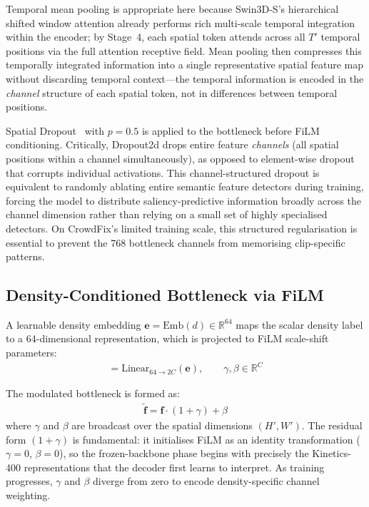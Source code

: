 \documentclass[twocolumn]{article}
\begin{document}
Temporal mean pooling is appropriate here because Swin3D-S's hierarchical
shifted window attention already performs rich multi-scale temporal
integration within the encoder; by Stage~4, each spatial token attends
across all $T'$ temporal positions via the full attention receptive field.
Mean pooling then compresses this temporally integrated information into
a single representative spatial feature map without discarding temporal
context---the temporal information is encoded in the \emph{channel} structure
of each spatial token, not in differences between temporal positions.

Spatial Dropout~\citep{pytorch} with $p\!=\!0.5$ is applied to the bottleneck
before FiLM conditioning.  Critically, Dropout2d drops entire feature
\emph{channels} (all spatial positions within a channel simultaneously),
as opposed to element-wise dropout that corrupts individual activations.
This channel-structured dropout is equivalent to randomly ablating entire
semantic feature detectors during training, forcing the model to distribute
saliency-predictive information broadly across the channel dimension rather
than relying on a small set of highly specialised detectors.  On CrowdFix's
limited training scale, this structured regularisation is essential to
prevent the 768 bottleneck channels from memorising clip-specific patterns.

\subsection{Density-Conditioned Bottleneck via FiLM}
\label{sec:bottleneck}

A learnable density embedding
$\mathbf{e} = \mathrm{Emb}(d) \in \mathbb{R}^{64}$ maps the scalar
density label to a 64-dimensional representation, which is projected to
FiLM scale-shift parameters:
\begin{align}
  [\gamma;\; \beta] = \mathrm{Linear}_{64 \to 2C}(\mathbf{e}),
  \qquad \gamma,\beta \in \mathbb{R}^{C}
  \label{eq:film_proj}
\end{align}

The modulated bottleneck is formed as:
\begin{align}
  \tilde{\mathbf{f}} = \mathbf{f} \cdot (1 + \gamma) + \beta
  \label{eq:film}
\end{align}
where $\gamma$ and $\beta$ are broadcast over the spatial dimensions
$(H', W')$.  The residual form $(1+\gamma)$ is fundamental: it initialises
FiLM as an identity transformation ($\gamma\!=\!0$, $\beta\!=\!0$),
so the frozen-backbone phase begins with precisely the Kinetics-400
representations that the decoder first learns to interpret.  As training
progresses, $\gamma$ and $\beta$ diverge from zero to encode
density-specific channel weighting.
\end{document}
